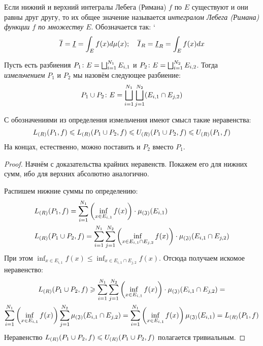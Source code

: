 \begin{definition}
	Если нижний и верхний интегралы Лебега (Римана) $f$ по $E$ существуют и они равны друг другу, то их общее значение называется \textit{интегралом Лебега (Римана) функции $f$ по множеству $E$}. Обозначается так:
`	\[
		\overline{I} = \underline{I} = \int_E f(x) d\mu(x); \quad \overline{I}_R = \underline{I}_R = \int_E f(x)dx
	\]
\end{definition}

\begin{definition}
	Пусть есть разбиения $P_1 \colon E = \bigsqcup_{i = 1}^{N_1} E_{i, 1}$ и $P_2 \colon E = \bigsqcup_{i = 1}^{N_2} E_{i, 2}$. Тогда \textit{измельчением} $P_1$ и $P_2$ мы назовём следующее разбиение:
	\[
		P_1 \cup P_2 \colon E = \bigsqcup_{i = 1}^{N_1} \bigsqcup_{j = 1}^{N_2} (E_{i, 1} \cap E_{j, 2})
	\]
\end{definition}

\begin{proposition}
	С обозначениями из определения измельчения имеют смысл такие неравенства:
	\[
		L_{(R)}(P_1, f) \leqslant L_{(R)}(P_1 \cup P_2, f) \leqslant U_{(R)}(P_1 \cup P_2, f) \leqslant U_{(R)}(P_1, f)
	\]
	На концах, естественно, можно поставить и $P_2$ вместо $P_1$.
\end{proposition}

\begin{proof}
	Начнём с доказательства крайних неравенств. Покажем его для нижних сумм, ибо для верхних абсолютно аналогично.
	
	Распишем нижние суммы по определению:
	\begin{align*}
		&{L_{(R)}(P_1, f) = \sum_{i = 1}^{N_1} \left(\inf_{x \in E_{i, 1}} f(x)\right) \cdot \operatorname{\mu_{(\mathfrak{J})}}(E_{i, 1})}
		\\
		&{L_{(R)}(P_1 \cup P_2, f) = \sum_{i = 1}^{N_1} \sum_{j = 1}^{N_2} \left(\inf_{x \in E_{i, 1} \cap E_{j, 2}} f(x)\right) \cdot \operatorname{\mu_{(\mathfrak{J})}}(E_{i, 1} \cap E_{j, 2})}
	\end{align*}
	При этом $\inf_{x \in E_{i, 1}} f(x) \le \inf_{x \in E_{i, 1} \cap E_{j, 2}} f(x)$. Отсюда получаем искомое неравенство:
	\begin{multline*}
		L_{(R)}(P_1 \cup P_2, f) \geqslant \sum_{i = 1}^{N_1} \sum_{j = 1}^{N_2} \left(\inf_{x \in E_{i, 1}} f(x)\right) \cdot \operatorname{\mu_{(\mathfrak{J})}}(E_{i, 1} \cap E_{j, 2}) =
		\\
		\sum_{i = 1}^{N_1} \left(\inf_{x \in E_{i, 1}} f(x)\right) \sum_{j = 1}^{N_2} \operatorname{\mu_{(\mathfrak{J})}}(E_{i, 1} \cap E_{j, 2}) = \sum_{i = 1}^{N_1} \left(\inf_{x \in E_{i, 1}} f(x)\right) \operatorname{\mu_{(\mathfrak{J})}}(E_{i, 1}) = L_{(R)}(P_1, f)
	\end{multline*}
	Неравенство $L_{(R)}(P_1 \cup P_2, f) \leqslant U_{(R)}(P_1 \cup P_2, f)$ полагается тривиальным.
\end{proof}

